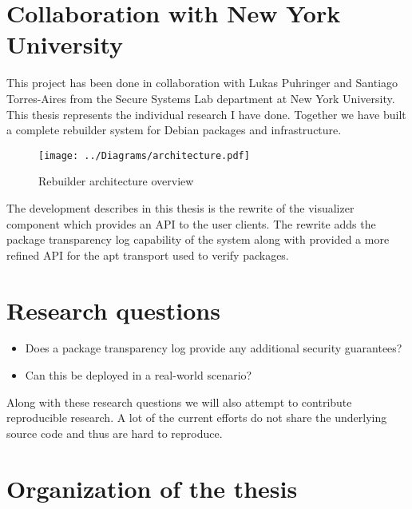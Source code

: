 \documentclass[../Main/thesis.tex]{subfiles}
\begin{document}
\section{Collaboration with New York University}\label{sec:collab}
This project has been done in collaboration with Lukas Puhringer and Santiago
Torres-Aires from the Secure Systems Lab department at New York University. This
thesis represents the individual research I have done. Together we have built a
complete rebuilder system for Debian packages and infrastructure. 

\begin{figure}[H]
\centering
\texttt{[image: ../Diagrams/architecture.pdf]}
\caption{Rebuilder architecture overview}
\label{fig:rebuilder_architecture}
\end{figure}

The development describes in this thesis is the rewrite of the visualizer
component which provides an API to the user clients. The rewrite adds the
package transparency log capability of the system along with provided a more
refined API for the apt transport used to verify packages.

\section{Research questions}\label{sec:rq}
\begin{itemize}
    \item Does a package transparency log provide any additional security guarantees?
    \item Can this be deployed in a real-world scenario?
\end{itemize}

Along with these research questions we will also attempt to contribute
reproducible research. A lot of the current efforts do not share the underlying
source code and thus are hard to reproduce.

\section{Organization of the thesis}\label{sec:organization}

\blankpage
\end{document}
